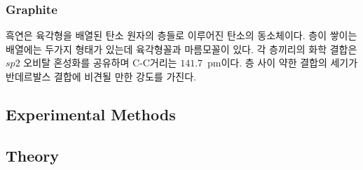 \documentclass[aps,reprint,superscriptaddress,11pt]{revtex4-2}
\begin{document}
\subsubsection{Graphite}
흑연은 육각형을 배열된 탄소 원자의 층들로 이루어진 탄소의 동소체이다. 층이 쌓이는 배열에는
두가지 형태가 있는데 육각형꼴과 마름모꼴이 있다. 각 층끼리의 화학 결합은 $sp2$ 오비탈 혼성화를
공유하며 C-C거리는 $141.7$~pm이다. 층 사이 약한 결합의 세기가 반데르발스 결합에 비견될 만한
강도를 가진다.
\subsection{Experimental Methods}
\subsection{Theory}

\nocite{*}





\vfill
\end{document}
